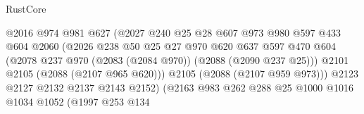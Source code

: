 \begin{lexlean}{RustCore}
\begin{coremodule}
                                        @2016
                                        @974
                                        @981
                                        @627
                                        (@2027
                                          @240
                                          @25
                                          @28
                                          @607
                                          @973
                                          @980
                                          @597
                                          @433
                                          @604
                                          @2060
                                          (@2026
                                            @238
                                            @50
                                            @25
                                            @27
                                            @970
                                            @620
                                            @637
                                            @597
                                            @470
                                            @604
                                            (@2078
                                              @237
                                              @970
                                              (@2083 (@2084 @970))
                                              (@2088 (@2090 @237 @25)))
                                            @2101
                                            @2105
                                            (@2088 (@2107 @965 @620)))
                                          @2105
                                          (@2088 (@2107 @959 @973)))
                                        @2123
                                        @2127
                                        @2132
                                        @2137
                                        @2143
                                        @2152)
                                      (@2163
                                        @983
                                        @262
                                        @288
                                        @25
                                        @1000
                                        @1016
                                        @1034
                                        @1052
                                        (@1997
                                          @253
                                          @134

\end{coremodule}
\end{lexlean}

